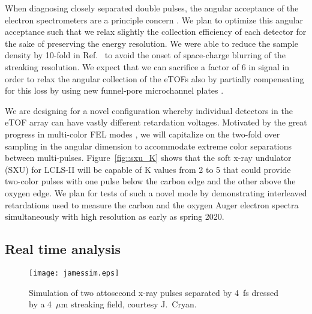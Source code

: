 When diagnosing closely separated double pulses, the angular acceptance of the electron spectrometers are a principle concern \cite{Worner2018}.
We plan to optimize this angular acceptance such that we relax slightly the collection efficiency of each detector for the sake of preserving the energy resolution.
We were able to reduce the sample density by 10-fold in Ref.~\cite{Nick2018} to avoid the onset of space-charge blurring of the streaking resolution.
We expect that we can sacrifice a factor of 6 in signal in order to relax the angular collection of the eTOFs also by partially compensating for this loss by using new funnel-pore microchannel plates \cite{funnelMCPcompare2018}.


We are designing for a novel configuration whereby individual detectors in the eTOF array can have vastly different retardation voltages.
Motivated by the great progress in multi-color FEL modes \cite{Lutman13_twocolor,Marinelli13_twocolor,Allaria2014,Marinelli2015,Prince2016,Lutman2016,Marinelli2016,Lutman2016FreshSlice}, we will capitalize on the two-fold over sampling in the angular dimension to accommodate extreme color separations between multi-pulses.
Figure~\ref{fig::sxu_K} shows that the soft x-ray undulator (SXU) for LCLS-II will be capable of K values from 2 to 5 that could provide two-color pulses with one pulse below the carbon edge and the other above the oxygen edge.
We plan for tests of such a novel mode by demonstrating interleaved retardations used to measure the carbon and the oxygen Auger electron spectra simultaneously with high resolution as early as spring 2020.



\subsection*{Real time analysis}
%
\begin{wrapfigure}[20]{r}{3.5in}
\vspace{-0.5\baselineskip}
\centerline{\texttt{[image: jamessim.eps]}}
\vspace{-0.5\baselineskip}
\caption{\label{fig::jamessim}Simulation of two attosecond x-ray pulses separated by 4~fs dressed by a 4~$\mu$m streaking field, courtesy J.~Cryan.}
\end{wrapfigure}


